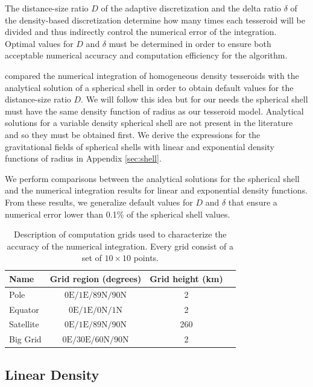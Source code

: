 \documentclass[extra]{gji}
\begin{document}
The distance-size ratio $D$ of the adaptive discretization and the delta ratio $\delta$
of the density-based discretization determine how many times each tesseroid will be
divided and thus indirectly control the numerical error of the integration.
Optimal values for $D$ and $\delta$ must be determined in order to ensure both
acceptable numerical accuracy and computation efficiency for the algorithm.

\citet{Uieda2016} compared the numerical integration of homogeneous density tesseroids
with the analytical solution of a spherical shell \citep{Mikuska2006,Grombein2013} in
order to obtain default values for the distance-size ratio $D$.
We will follow this idea but for our needs the spherical shell must
have the same density function of radius as our tesseroid model.
Analytical solutions for a variable density spherical shell are not present in the
literature and so they must be obtained first.
We derive the expressions for the gravitational fields of spherical shells with linear
and exponential density functions of radius in Appendix \ref{sec:shell}.

We perform comparisons between the analytical solutions for the spherical shell and the
numerical integration results for linear and exponential density functions.
From these results, we generalize default values for $D$ and $\delta$ that ensure a
numerical error lower than 0.1\% of the spherical shell values.

\begin{table}
\caption{
    Description of computation grids used to characterize the accuracy of
    the numerical integration.
    Every grid consist of a set of $10 \times 10$ points.
}
\label{tab:grids}
\begin{tabular}{lccc}
    Name & Grid region (degrees) & Grid height (km)
    \\ \hline
    Pole & $0\text{E}/1\text{E}/89\text{N}/90\text{N}$ & 2 \\
    Equator & $0\text{E}/1\text{E}/0\text{N}/1\text{N}$ & 2 \\
    Satellite & $0\text{E}/1\text{E}/89\text{N}/90\text{N}$ & 260 \\
    Big Grid & $0\text{E}/30\text{E}/60\text{N}/90\text{N}$ & 2 \\
\end{tabular}
\end{table}


\subsection{Linear Density}
\end{document}
